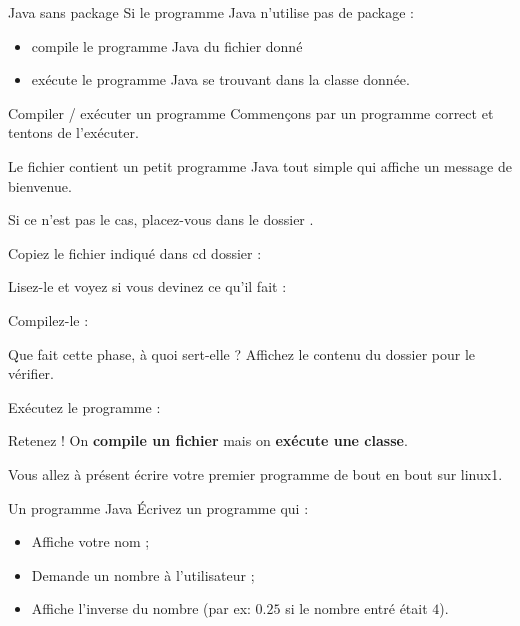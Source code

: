 \documentclass[a4paper,11pt]{style-esi/td}
\begin{document}
		\begin{theorie}{Java sans package}
			Si le programme Java n'utilise pas de package :
			\begin{itemize}
				\item {} compile le programme Java du fichier donné
				\item {} exécute le programme Java se trouvant dans la classe donnée.
			\end{itemize}
		\end{theorie}

		\begin{Tutoriel}{Compiler / exécuter un programme} 
			Commençons par un programme correct et tentons de l'exécuter.  
		
			Le fichier  
			contient un petit programme Java tout simple qui affiche un message de bienvenue. 
			
			\begin{steps}	
			\item 
				Si ce n'est pas le cas, placez-vous dans le dossier .
			\item 
				Copiez le fichier indiqué dans cd dossier :
			\item 
				Lisez-le et voyez si vous devinez ce qu'il fait : 
			\item 
				Compilez-le : 
			\item 
				Que fait cette phase, à quoi sert-elle ?
				Affichez le contenu du dossier pour le vérifier.
			\item Exécutez le programme : 
			\end{steps}			
		\end{Tutoriel}


		\begin{alerttbox}{Retenez !} 
			On \textbf{compile un fichier} mais on \textbf{exécute une classe}.
		\end{alerttbox}

		Vous allez à présent écrire votre premier programme de bout en bout sur linux1. 
		
		\begin{Exercice}{Un programme Java}
			Écrivez un programme qui :
			\begin{itemize}
			\item Affiche votre nom ;
			\item Demande un nombre à l'utilisateur ;
			\item Affiche l'inverse du nombre (par ex: $0.25$ si le nombre entré était $4$).
			\end{itemize}
		\end{Exercice}
\end{document}
